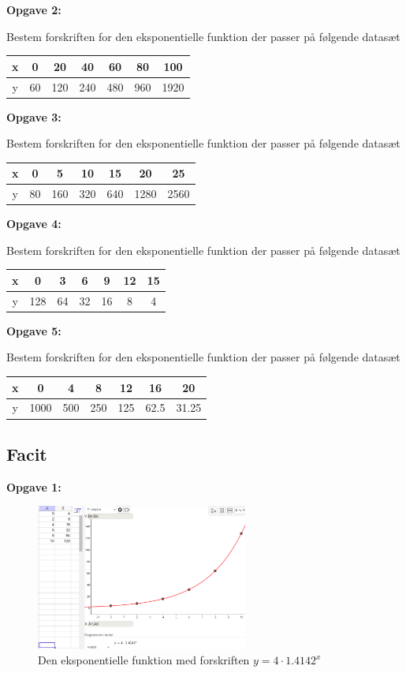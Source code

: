 \textbf{Opgave 2:}

Bestem forskriften for den eksponentielle funktion der passer på følgende datasæt
\begin{tabular}{c|c|c|c|c|c|c}
x & 0 & 20 & 40 & 60 & 80 & 100 \\\hline
y & 60 & 120 & 240 & 480 & 960 & 1920
\end{tabular}

\textbf{Opgave 3:}

Bestem forskriften for den eksponentielle funktion der passer på følgende datasæt
\begin{tabular}{c|c|c|c|c|c|c}
x & 0 & 5 & 10 & 15 & 20 & 25 \\\hline
y & 80 & 160 & 320 & 640 & 1280 & 2560
\end{tabular}

\textbf{Opgave 4:}

Bestem forskriften for den eksponentielle funktion der passer på følgende datasæt
\begin{tabular}{c|c|c|c|c|c|c}
x & 0 & 3 & 6 & 9 & 12 & 15 \\\hline
y & 128 & 64 & 32 & 16 & 8 & 4
\end{tabular}

\textbf{Opgave 5:}

Bestem forskriften for den eksponentielle funktion der passer på følgende datasæt
\begin{tabular}{c|c|c|c|c|c|c}
x & 0 & 4 & 8 & 12 & 16 & 20 \\\hline
y & 1000 & 500 & 250 & 125 & 62.5 & 31.25
\end{tabular}




\newpage


\subsection*{Facit}


\textbf{Opgave 1:}

\begin{figure}[ht]
\includegraphics[width=0.62\textwidth, height=0.27\textwidth]{ans_1}
\caption{Den eksponentielle funktion med forskriften $y = 4\cdot 1.4142^x$}
\end{figure}

